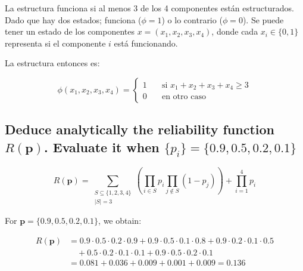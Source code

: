 \documentclass[12pt]{article}\usepackage[]{graphicx}\usepackage[]{xcolor}
\begin{document}
La estructura funciona si al menos 3 de los 4 componentes están estructurados. Dado que hay dos estados; funciona ($\phi = 1$) o lo contrario ($\phi = 0$). Se puede tener un estado de los componentes $x = (x_{1}, x_{2}, x_{3}, x_{4})$, donde cada $x_{i} \in \{0, 1 \}$ representa si el componente $i$ está funcionando.

La estructura entonces es:

\[
\phi (x_{1}, x_{2}, x_{3}, x_{4}) =
\begin{cases}
  1 & \quad \text{si } x_{1} + x_{2} + x_{3} + x_{4} \geq 3 \\
  0 & \quad \text{en otro caso}
\end{cases}
\]

\subsection{Deduce analytically the reliability function $R(\mathbf{p})$. Evaluate it when $\{p_{i} \} = \{0.9, 0.5, 0.2, 0.1\} $}


\[
R(\mathbf{p}) = \sum_{\substack{S \subseteq \{1,2,3,4\} \\ |S| = 3}} \left( \prod_{i \in S} p_i \prod_{j \notin S} (1 - p_j) \right) + \prod_{i=1}^{4} p_i
\]

For $\mathbf{p} = \{0.9, 0.5, 0.2, 0.1\}$, we obtain:

\[
\begin{aligned}
R(\mathbf{p}) &= 0.9 \cdot 0.5 \cdot 0.2 \cdot 0.9 + 0.9 \cdot 0.5 \cdot 0.1 \cdot 0.8 + 0.9 \cdot 0.2 \cdot 0.1 \cdot 0.5 \\
&\quad + 0.5 \cdot 0.2 \cdot 0.1 \cdot 0.1 + 0.9 \cdot 0.5 \cdot 0.2 \cdot 0.1 \\
&= 0.081 + 0.036 + 0.009 + 0.001 + 0.009 = \boxed{0.136}
\end{aligned}
\]
\end{document}
